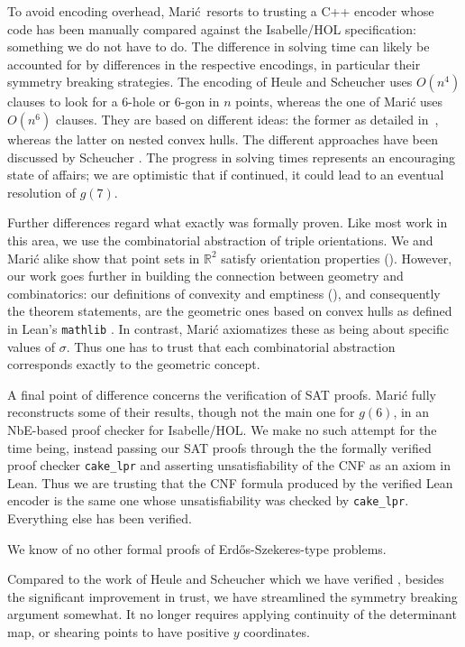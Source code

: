 To avoid encoding overhead,
Marić resorts to trusting a C++ encoder
whose code has been manually compared against the Isabelle/HOL specification:
something we do not have to do.
The difference in solving time
can likely be accounted for by differences in the respective encodings,
in particular their symmetry breaking strategies.
The encoding of Heule and Scheucher uses $O(n^4)$ clauses
to look for a $6$-hole or $6$-gon in $n$ points,
whereas the one of Marić uses $O(n^6)$ clauses.
They are based on different ideas:
the former as detailed in~,
whereas the latter on nested convex hulls.
The different approaches have been discussed by Scheucher \cite{scheucherTwoDisjoint5holes2020}.
The progress in solving times
represents an encouraging state of affairs;
we are optimistic that if continued,
it could lead to an eventual resolution of $g(7)$.

Further differences regard what exactly was formally proven.
Like most work in this area,
we use the combinatorial abstraction of triple orientations.
We and Marić alike show that point sets in $\mathbb R^2$
satisfy orientation properties ().
However, our work goes further in building the connection
between geometry and combinatorics:
our definitions of convexity and emptiness (),
and consequently the theorem statements,
are the geometric ones based on convex hulls
as defined in Lean's \texttt{mathlib} \cite{20lean_mathematical_library}.
In contrast, Marić axiomatizes these as being about specific values of $\sigma$.
Thus one has to trust that each combinatorial abstraction
corresponds exactly to the geometric concept.

A final point of difference concerns the verification of SAT proofs.
Marić fully reconstructs some of their results,
though not the main one for $g(6)$,
in an NbE-based proof checker for Isabelle/HOL.
We make no such attempt for the time being,
instead passing our SAT proofs through the the formally verified proof checker \texttt{cake\_lpr} \cite{tanVerifiedPropagationRedundancy2023}
and asserting unsatisfiability of the CNF as an axiom in Lean.
Thus we are trusting that the CNF formula produced by the verified Lean encoder
is the same one whose unsatisfiability was checked by \texttt{cake\_lpr}.
Everything else has been verified.

We know of no other formal proofs of Erd\H{o}s-Szekeres-type problems.

Compared to the work of Heule and Scheucher which we have verified \cite{emptyHexagonNumber},
besides the significant improvement in trust,
we have streamlined the symmetry breaking argument somewhat.
It no longer requires applying continuity of the determinant map,
or shearing points to have positive $y$ coordinates.

